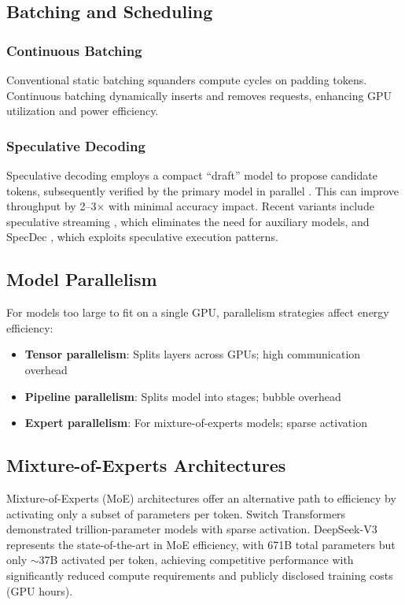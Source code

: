 \documentclass[11pt]{article}
\begin{document}
\subsection{Batching and Scheduling}

\subsubsection{Continuous Batching}

Conventional static batching squanders compute cycles on padding tokens. Continuous batching dynamically inserts and removes requests, enhancing GPU utilization and power efficiency.

\subsubsection{Speculative Decoding}

Speculative decoding employs a compact ``draft'' model to propose candidate tokens, subsequently verified by the primary model in parallel \cite{leviathan2022speculative, chen2023speculativesampling}. This can improve throughput by 2--3$\times$ with minimal accuracy impact. Recent variants include speculative streaming \cite{bhendawade2024speculativestreaming}, which eliminates the need for auxiliary models, and SpecDec \cite{xia2023specdec}, which exploits speculative execution patterns.

\subsection{Model Parallelism}

For models too large to fit on a single GPU, parallelism strategies affect energy efficiency:
\begin{itemize}
    \item \textbf{Tensor parallelism}: Splits layers across GPUs; high communication overhead
    \item \textbf{Pipeline parallelism}: Splits model into stages; bubble overhead
    \item \textbf{Expert parallelism}: For mixture-of-experts models; sparse activation
\end{itemize}

\subsection{Mixture-of-Experts Architectures}

Mixture-of-Experts (MoE) architectures offer an alternative path to efficiency by activating only a subset of parameters per token. Switch Transformers \cite{fedus2022switch} demonstrated trillion-parameter models with sparse activation. DeepSeek-V3 \cite{deepseek2024v3report} represents the state-of-the-art in MoE efficiency, with 671B total parameters but only $\sim$37B activated per token, achieving competitive performance with significantly reduced compute requirements and publicly disclosed training costs (GPU hours).
\end{document}
